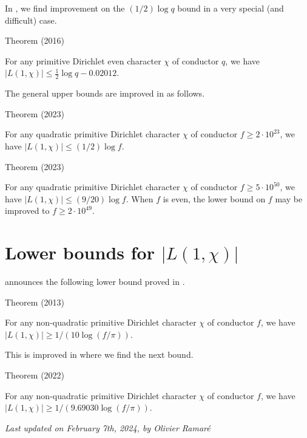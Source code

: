 In
\cite{SaadEddin*16},
we find improvement on the $(1/2)\log q$ bound in a very special (and
difficult) case.
\begin{thm}{Theorem (2016)}

For any primitive Dirichlet even character $\chi$ of conductor $q$,
we have
$ |L(1,\chi)|\le\tfrac12\log q - 0.02012 $.
\end{thm}



The general upper bounds are improved in
\cite{Johnston-Ramare-Trudgian*23}
as follows.

\begin{thm}{Theorem (2023)}

For any quadratic primitive Dirichlet character $\chi$ of conductor
$f\ge 2\cdot 10^{23}$,
we have $|L(1,\chi)|\le (1/ 2) \log f$. 
\end{thm}


\begin{thm}{Theorem (2023)}

For any quadratic primitive Dirichlet character $\chi$ of conductor
$f\ge 5\cdot 10^{50}$,
we have $|L(1,\chi)|\le (9/ 20) \log f$. When $f$ is even, the lower
bound on $f$ may be improved to $f\ge 2\cdot 10^{49}$.
\end{thm}




\section{Lower bounds for $|L(1,\chi)|$}

\cite{Louboutin*13}
announces the following lower bound proved in
\cite{Louboutin*15}
.

\begin{thm}{Theorem (2013)}

For any non-quadratic primitive Dirichlet character $\chi$ of conductor $f$,
we have $|L(1,\chi)|\ge 1/ ( 10\log(f/\pi))$.
\end{thm}


This is improved in
\cite{Mossinghoff-Starichkova-Trudgian*22}
where we find the next bound.
\begin{thm}{Theorem (2022)}

For any non-quadratic primitive Dirichlet character $\chi$ of conductor $f$,
we have $|L(1,\chi)|\ge 1/ ( 9.69030\log(f/\pi))$.
\end{thm}




 
 








  
\begin{flushright}\small\sl{}   Last updated on February 7th, 2024, by Olivier Ramar\'e
 \end{flushright}
















